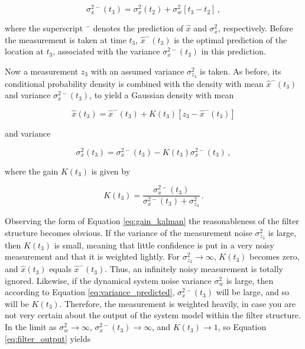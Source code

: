 \begin{equation}\label{eq:variance_predicted}
  \sigma^{2-}_x(t_3)=\sigma^2_x(t_2)+\sigma^2_w[t_3-t_2]\,,
\end{equation}

\noindent
where the superscript $^-$ denotes the prediction of $\hat{x}$ and $\sigma^{2}_x$, respectively. Before the measurement is taken at time $t_3$, $\hat{x}^-(t_3)$ is the optimal prediction of the location at $t_3$, associated with the variance $\sigma^{2-}_x(t_3)$ in this prediction.

Now a measurement $z_3$ with an assumed variance $\sigma^2_{z_3}$ is taken. As before, its conditional probability density is combined with the density with mean $\hat{x}^-(t_3)$ and variance $\sigma^{2-}_x(t_3)$, to yield a Gaussian density with mean

\begin{equation}\label{eq:estimation_kalman}
  \hat{x}(t_3) = \hat{x}^-(t_3) + K(t_3)[z_3-\hat{x}^-(t_3)]
\end{equation}

\noindent
and variance

\begin{equation}\label{eq:variance_kalman}
  \sigma^2_x(t_3) = \sigma^{2-}_x(t_3)-K(t_3)\sigma^{2-}_x(t_3)\,,
\end{equation}

\noindent
where the gain $K(t_3)$ is given by

\begin{equation}\label{eq:gain_kalman}
  K(t_3) = \frac{\sigma^{2-}_x(t_3)}{\sigma^{2-}_x(t_3)+\sigma^2_{z_3}}\,.
\end{equation}

Observing the form of Equation \ref{eq:gain_kalman} the reasonableness of the filter structure becomes obvious. If the variance of the measurement noise $\sigma^2_{z_3}$ is large, then $K(t_3)$ is small, meaning that little confidence is put in a very noisy measurement and that it is weighted lightly. For $\sigma^2_{z_3}\rightarrow\infty$, $K(t_3)$ becomes zero, and $\hat{x}(t_3)$ equals $\hat{x}^-(t_3)$. Thus, an infinitely noisy measurement is totally ignored. Likewise, if the dynamical system noise variance $\sigma^2_w$ is large, then according to Equation \ref{eq:variance_predicted}, $\sigma^{2-}_x(t_3)$ will be large, and so will be $K(t_3)$. Therefore, the measurement is weighted heavily, in case you are not very certain about the output of the system model within the filter structure. In the limit as $\sigma^2_w \rightarrow\infty$, $\sigma^{2-}_x(t_3) \rightarrow\infty$, and $K(t_3) \rightarrow1$, so Equation \ref{eq:filter_output} yields

